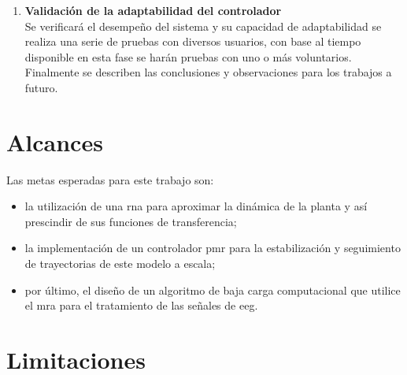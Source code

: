 \begin{enumerate}[noitemsep, nolistsep, leftmargin = 15mm, label = \alph*)]
        \item \textbf{Validación de la adaptabilidad del controlador}\\Se verificará el desempeño del sistema y su capacidad de adaptabilidad se realiza una serie de pruebas con diversos usuarios, con base al tiempo disponible en esta fase se harán pruebas con uno o más voluntarios. Finalmente se describen las conclusiones y observaciones para los trabajos a futuro.
    \end{enumerate}

\section{Alcances}

    Las metas esperadas para este trabajo son:
    \begin{itemize}[noitemsep, nolistsep, leftmargin = 15mm]
        \item la utilización de una \acrlong{rna} para aproximar la dinámica de la planta y así prescindir de sus funciones de transferencia;
        \item la implementación de un controlador \acrlong{pmr} para la estabilización y seguimiento de trayectorias de este modelo a escala;
        \item por último, el diseño de un algoritmo de baja carga computacional que utilice el \acrlong{mra} para el tratamiento de las señales de \acrlong{eeg}.
    \end{itemize}
    
\section{Limitaciones}
    
